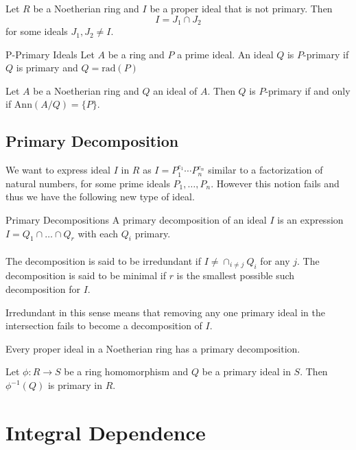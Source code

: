 \documentclass[a4paper]{article}
\begin{document}
\begin{lmm}{}{} Let $R$ be a Noetherian ring and $I$ be a proper ideal that is not primary. Then $$I=J_1\cap J_2$$ for some ideals $J_1,J_2\neq I$. 
\end{lmm}

\begin{defn}{P-Primary Ideals}{} Let $A$ be a ring and $P$ a prime ideal. An ideal $Q$ is $P$-primary if $Q$ is primary and $Q=\text{rad}(P)$
\end{defn}

\begin{thm}{}{} Let $A$ be a Noetherian ring and $Q$ an ideal of $A$. Then $Q$ is $P$-primary if and only if $\text{Ann}(A/Q)=\{P\}$. 
\end{thm}

\subsection{Primary Decomposition}
We want to express ideal $I$ in $R$ as $I=P_1^{e_1}\cdots P_n^{e_n}$ similar to a factorization of natural numbers, for some prime ideals $P_1,\dots,P_n$. However this notion fails and thus we have the following new type of ideal. 

\begin{defn}{Primary Decompositions}{} A primary decomposition of an ideal $I$ is an expression $I=Q_1\cap\dots\cap Q_r$ with each $Q_i$ primary. \\~\\
The decomposition is said to be irredundant if $I\neq\cap_{i\neq j}Q_i$ for any $j$. The decomposition is said to be minimal if $r$ is the smallest possible such decomposition for $I$. 
\end{defn}

Irredundant in this sense means that removing any one primary ideal in the intersection fails to become a decomposition of $I$. 

\begin{thm}{}{} Every proper ideal in a Noetherian ring has a primary decomposition. 
\end{thm}

\begin{lmm}{}{} Let $\phi:R\to S$ be a ring homomorphism and $Q$ be a primary ideal in $S$. Then $\phi^{-1}(Q)$ is primary in $R$. 
\end{lmm}

\pagebreak
\section{Integral Dependence}
\end{document}
